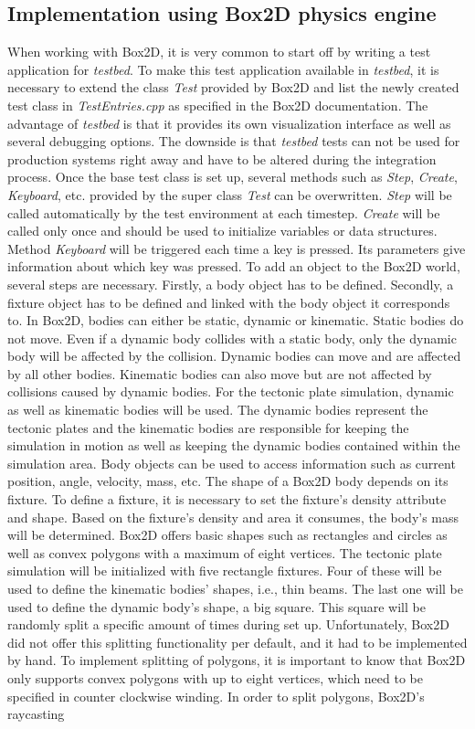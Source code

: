 \documentclass[11pt,a4paper,twoside,openright]{report}
\begin{document}
\subsection{Implementation using Box2D physics engine}
\label{subsec:implbox2d}
When working with Box2D, it is very common to start off by writing a test application for \emph{testbed}. To make this test application available in \emph{testbed}, it is necessary to extend the class \emph{Test} provided by Box2D and list the newly created test class in \emph{TestEntries.cpp} as specified in the Box2D documentation. The advantage of \emph{testbed} is that it provides its own visualization interface as well as several debugging options. The downside is that \emph{testbed} tests can not be used for production systems right away and have to be altered during the integration process.
Once the base test class is set up, several methods such as \emph{Step}, \emph{Create}, \emph{Keyboard}, etc. provided by the super class \emph{Test} can be overwritten. \emph{Step} will be called automatically by the test environment at each timestep. \emph{Create} will be called only once and should be used to initialize variables or data structures. Method \emph{Keyboard} will be triggered each time a key is pressed. Its parameters give information about which key was pressed. To add an object to the Box2D world, several steps are necessary. Firstly, a body object has to be defined. Secondly, a fixture object has to be defined and linked with the body object it corresponds to. In Box2D, bodies can either be static, dynamic or kinematic. Static bodies do not move. Even if a dynamic body collides with a static body, only the dynamic body will be affected by the collision. Dynamic bodies can move and are affected by all other bodies. Kinematic bodies can also move but are not affected by collisions caused by dynamic bodies. For the tectonic plate simulation, dynamic as well as kinematic bodies will be used. The dynamic bodies represent the tectonic plates and the kinematic bodies are responsible for keeping the simulation in motion as well as keeping the dynamic bodies contained within the simulation area. Body objects can be used to access information such as current position, angle, velocity, mass, etc. The shape of a Box2D body depends on its fixture. To define a fixture, it is necessary to set the fixture's density attribute and shape. Based on the fixture's density and area it consumes, the body's mass will be determined. Box2D offers basic shapes such as rectangles and circles as well as convex polygons with a maximum of eight vertices. The tectonic plate simulation will be initialized with five rectangle fixtures. Four of these will be used to define the kinematic bodies' shapes, i.e., thin beams. The last one will be used to define the dynamic body's shape, a big square. This square will be randomly split a specific amount of times during set up. Unfortunately, Box2D did not offer this splitting functionality per default, and it had to be implemented by hand. To implement splitting of polygons, it is important to know that Box2D only supports convex polygons with up to eight vertices, which need to be specified in counter clockwise winding. In order to split polygons, Box2D's raycasting 
\end{document}
